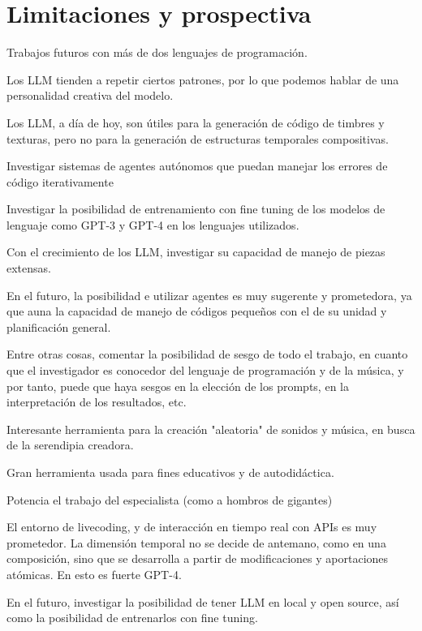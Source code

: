 \chapter{Limitaciones y prospectiva}



Trabajos futuros con más de dos lenguajes de programación.

Los LLM tienden a repetir ciertos patrones, por lo que podemos hablar de una personalidad creativa del modelo.

Los LLM, a día de hoy, son útiles para la generación de código de timbres y texturas, pero no para la generación de estructuras temporales compositivas.

Investigar sistemas de agentes autónomos que puedan manejar los errores de código iterativamente

Investigar la posibilidad de entrenamiento con fine tuning de los modelos de lenguaje como GPT-3 y GPT-4 en los lenguajes utilizados.

Con el crecimiento de los LLM, investigar su capacidad de manejo de piezas extensas.

En el futuro, la posibilidad e utilizar agentes es muy sugerente y prometedora, ya que auna la capacidad de manejo de códigos pequeños con el de su unidad y planificación general.

Entre otras cosas, comentar la posibilidad de sesgo de todo el trabajo, en cuanto que el investigador es conocedor del lenguaje de programación y de la música, y por tanto, puede que haya sesgos en la elección de los prompts, en la interpretación de los resultados, etc.

Interesante herramienta para la creación "aleatoria" de sonidos y música, en busca de la serendipia creadora.

Gran herramienta usada para fines educativos y de autodidáctica.

Potencia el trabajo del especialista (como a hombros de gigantes)

El entorno de livecoding, y de interacción en tiempo real con APIs es muy prometedor. La dimensión temporal no se decide de antemano, como en una composición, sino que se desarrolla a partir de modificaciones y aportaciones atómicas. En esto es fuerte GPT-4.

En el futuro, investigar la posibilidad de tener LLM en local y open source, así como la posibilidad de entrenarlos con fine tuning.


